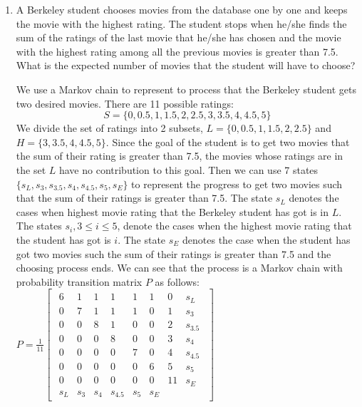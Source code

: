 \begin{enumerate}[label=\alph*)]
\item
A Berkeley student chooses movies from the database one by one and 
keeps the movie with the highest rating. The student stops when he/she 
finds the sum of the ratings of the last movie that he/she has chosen 
and the movie with the highest rating among all the previous movies is 
greater than 7.5. What is the expected number of movies that the 
student will have to choose?
\begin{solution}[9cm]
We use a Markov chain to represent to process that the Berkeley student 
gets two desired movies. There are 11 possible ratings:
\begin{equation*}
S = \{0, 0.5, 1, 1.5, 2, 2.5, 3, 3.5, 4, 4.5, 5 \}
\end{equation*}
We divide the set of ratings into 2 subsets, $L = \{0, 0.5, 1, 1.5, 2, 
2.5\}$ and $H = \{3, 3.5, 4, 4.5, 5\}$. Since the goal of the student 
is to get two movies that the sum of their rating is greater than 7.5, 
the movies whose ratings are in the set $L$ have no contribution to 
this goal. Then we can use 7 states $\{s_L, s_3, s_{3.5}, s_4, s_{4.5}, 
s_5, s_E\}$ to represent the progress to get two movies such that the 
sum of their ratings is greater than 7.5. The state $s_L$ denotes the 
cases when highest movie rating that the Berkeley student has got is 
in $L$. The states $s_i, 3 \leq i \leq 5$, denote the cases when the 
highest movie rating that the student has got is $i$. The state $s_E$ 
denotes the case when the student has got two movies such the sum of 
their ratings is greater than 7.5 and the choosing process ends. We 
can see that the process is a Markov chain with probability transition 
matrix $P$ as follows: \newpage
$P = \frac{1}{11}
\begin{bmatrix}
\begin{array}{ccccccc|c}
6 & 1 & 1 & 1 & 1 & 1 & 0 & s_L \\
0 & 7 & 1 & 1 & 1 & 0 & 1 & s_3 \\
0 & 0 & 8 & 1 & 0 & 0 & 2 & s_{3.5} \\
0 & 0 & 0 & 8 & 0 & 0 & 3 & s_4 \\
0 & 0 & 0 & 0 & 7 & 0 & 4 & s_{4.5} \\
0 & 0 & 0 & 0 & 0 & 6 & 5 & s_5 \\
0 & 0 & 0 & 0 & 0 & 0 & 11 & s_E \\
\hline
s_L & s_3 & s_4 & s_{4.5} & s_5 & s_E
\end{array}
\end{bmatrix}$ \\

\end{solution}
\end{enumerate}
